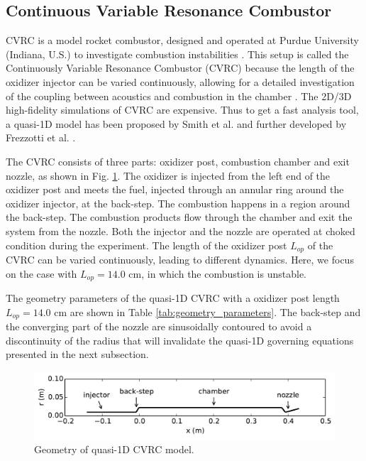 \subsection{Continuous Variable Resonance Combustor} \label{sec:5.res.4}

CVRC is a model rocket combustor, designed and operated at Purdue University (Indiana, U.S.) to investigate combustion instabilities \cite{yu2008combustion}. This setup is called the Continuously Variable Resonance Combustor (CVRC) because the length of the oxidizer injector can be varied continuously, allowing for a detailed investigation of the coupling between acoustics and combustion in the chamber \cite{garby2013simulations}. The 2D/3D high-fidelity simulations of CVRC are expensive. Thus to get a fast analysis tool, a quasi-1D model has been proposed by Smith et al. \cite{smith2008computational} and further developed by Frezzotti et al. \cite{frezzotti2015determination,frezzotti2017numerical,frezzotti2018quasi}. 


The CVRC consists of three parts: oxidizer post, combustion chamber and exit nozzle, as shown in Fig. \ref{fig:radius}. The oxidizer is injected from the left end of the oxidizer post and meets the fuel, injected through an annular ring around the oxidizer injector, at the back-step. The combustion happens in a region around the back-step. The combustion products flow through the chamber and exit the system from the nozzle.  Both the injector and the nozzle are operated at choked condition during the experiment. The length of the oxidizer post $L_{op}$ of the CVRC can be varied continuously, leading to different dynamics. Here, we focus on the case with $L_{op}= 14.0$ cm, in which the combustion is unstable.

The geometry parameters of the quasi-1D CVRC with a oxidizer post length  $L_{op}= 14.0$ cm are shown in Table \ref{tab:geometry_parameters}.  The back-step and the converging part of the nozzle are sinusoidally contoured to avoid a discontinuity of the radius that will invalidate the quasi-1D governing equations presented in the next subsection. 

\begin{figure}
	\centering
	\includegraphics[width=0.8\linewidth]{pic/radius}
	\caption{Geometry of quasi-1D CVRC model.}
	\label{fig:radius}
\end{figure}

